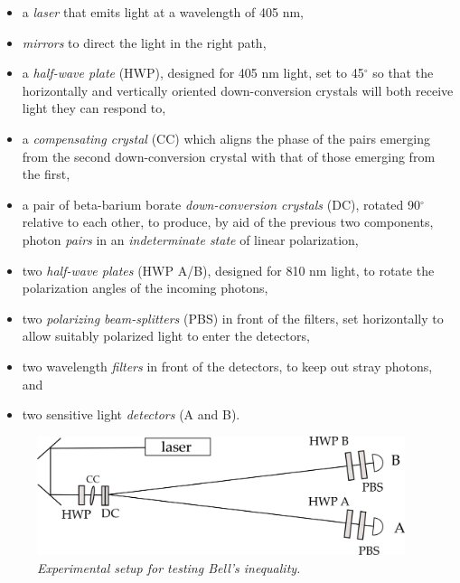 \begin{itemize}
	
\item{a \emph{laser} that emits light at a wavelength of 405 nm,}

\item{\emph{mirrors} to direct the light in the right path,}

\item{a \emph{half-wave plate} (HWP), designed for 405 nm light, set to 45$^\circ$ so that the horizontally and vertically oriented down-conversion crystals will both receive light they can respond to,}

\item{a \emph{compensating crystal} (CC) which aligns the phase of the pairs emerging from the second down-conversion crystal with that of those emerging from the first,}

\item{a pair of beta-barium borate \emph{down-conversion crystals} (DC), rotated 90$^\circ$ relative to each other, to produce, by aid of the previous two components, photon \emph{pairs} in an \emph{indeterminate state} of linear polarization,}

\item{two \emph{half-wave plates} (HWP A/B), designed for 810 nm light, to rotate the polarization angles of the incoming photons,}

\item{two \emph{polarizing beam-splitters} (PBS) in front of the filters, set horizontally to allow suitably polarized light to enter the detectors,}

\item{two wavelength \emph{filters} in front of the detectors, to keep out stray photons, and}

\item{two sensitive light \emph{detectors} (A and B).}
	
\end{itemize}

\begin{figure}[h]
  \begin{center}
    \includegraphics[width=4.23667in,height=1.37333in]{images/17_bell/bell-apparatus.png}
    \captionsetup{width=.75\textwidth}
    \caption*{\emph{Experimental setup for testing Bell's inequality.}}
  \end{center}
\end{figure}

